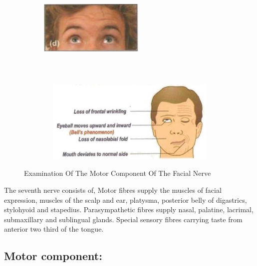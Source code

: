 \documentclass[a4paper,12pt,openany,oneside]{book}
\begin{document}
{\begin{figure}
\begin{subfigure}[t]{.48\textwidth}
		\end{subfigure}
		\hspace{\fill}
		\begin{subfigure}[t]{.48\textwidth}
			\centering
			\includegraphics[width=5cm,height=5cm]{./clinicalPhysioPic/cranialNerves7_12/7thNerve_4.jpg}
		\end{subfigure}
		\hspace{\fill}
		\begin{subfigure}[t]{\textwidth}
			\centering
			\includegraphics[width=10cm,height=4cm]{./clinicalPhysioPic/cranialNerves7_12/7thNerve_BellsPalsy.jpg}
		\end{subfigure}
		\hspace{\fill}
		\caption*{Examination Of The Motor Component Of The Facial Nerve}
	\end{figure}
}
The seventh nerve consists of,
Motor fibres supply the muscles of facial expression, muscles of the scalp and ear, platysma, posterior belly of digastrics, stylohyoid and stapedius.
Parasympathetic fibres supply nasal, palatine, lacrimal, submaxillary and sublingual glands.
Special sensory fibres carrying taste from anterior two third of the tongue.
\subsection*{Motor component:}
\end{document}
